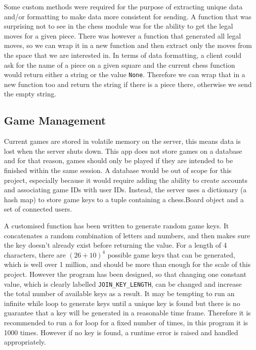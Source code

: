 Some custom methods were required for the purpose of extracting unique data and/or formatting to make data more consistent for sending. A function that was surprising not to see in the chess module was for the ability to get the legal moves for a given piece. There was however a function that generated all legal moves, so we can wrap it in a new function and then extract only the moves from the space that we are interested in. In terms of data formatting, a client could ask for the name of a piece on a given square and the current chess function would return either a string or the value \lstinline{None}. Therefore we can wrap that in a new function too and return the string if there is a piece there, otherwise we send the empty string.

\subsection{Game Management}
\label{GameManagement}

Current games are stored in volatile memory on the server, this means data is lost when the server shuts down. This app does not store games on a database and for that reason, games should only be played if they are intended to be finished within the same session. A database would be out of scope for this project, especially because it would require adding the ability to create accounts and associating game IDs with user IDs. Instead, the server uses a dictionary (a hash map) to store game keys to a tuple containing a chess.Board object and a set of connected users.

A customised function has been written to generate random game keys. It concatenates a random combination of letters and numbers, and then makes sure the key doesn't already exist before returning the value. For a length of 4 characters, there are $(26 + 10)^4$ possible game keys that can be generated, which is well over 1 million, and should be more than enough for the scale of this project. However the program has been designed, so that changing one constant value, which is clearly labelled \lstinline{JOIN_KEY_LENGTH}, can be changed and increase the total number of available keys as a result. It may be tempting to run an infinite while loop to generate keys until a unique key is found but there is no guarantee that a key will be generated in a reasonable time frame. Therefore it is recommended to run a for loop for a fixed number of times, in this program it is 1000 times. However if no key is found, a runtime error is raised and handled appropriately.

